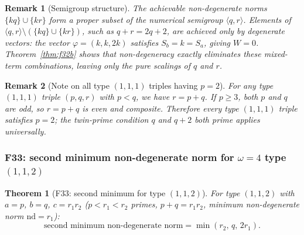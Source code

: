 \documentclass[12pt]{article}
\newtheorem{theorem}{Theorem}
\newtheorem{remark}{Remark}
\theoremstyle{definition}
\begin{document}
\begin{remark}[Semigroup structure]\label{rem:semigroup}
  The achievable non-degenerate norms $\{kq\}\cup\{kr\}$ form a proper subset of
  the numerical semigroup $\langle q,r \rangle$.
  Elements of $\langle q,r \rangle \setminus (\{kq\}\cup\{kr\})$, such as $q+r=2q+2$,
  are achieved only by \emph{degenerate} vectors: the vector $\varphi = (k,k,2k)$
  satisfies $S_b = k = S_a$, giving $W = 0$.
  Theorem~\ref{thm:f32b} shows that non-degeneracy exactly eliminates these
  mixed-term combinations, leaving only the pure scalings of $q$ and $r$.
\end{remark}

\begin{remark}[Note on all type $(1,1,1)$ triples having $p=2$]
  For any type $(1,1,1)$ triple $(p,q,r)$ with $p < q$, we have $r = p+q$.
  If $p \ge 3$, both $p$ and $q$ are odd, so $r = p+q$ is even and composite.
  Therefore every type $(1,1,1)$ triple satisfies $p=2$; the twin-prime condition
  $q$ and $q+2$ both prime applies universally.
\end{remark}

\subsubsection*{F33: second minimum non-degenerate norm for $\omega=4$ type $(1,1,2)$}

\begin{theorem}[F33: second minimum for type $(1,1,2)$]\label{thm:f33}
  For type $(1,1,2)$ with $a=p$, $b=q$, $c=r_1 r_2$ ($p < r_1 < r_2$ primes,
  $p+q = r_1 r_2$, minimum non-degenerate norm $\mathrm{nd} = r_1$):
  \[
    \text{second minimum non-degenerate norm} = \min(r_2,\, q,\, 2r_1).
  \]
\end{theorem}
\end{document}
